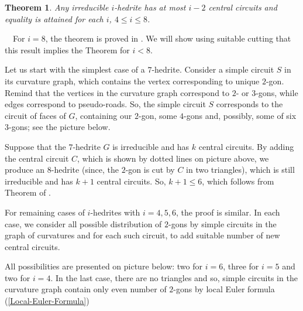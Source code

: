 \documentclass[12pt]{article}
\newtheorem{theor}{Theorem}
\newcommand{\proof}{\noindent{\bf Proof.}\ \ }
\begin{document}
\begin{theor}\label{irre}
Any irreducible $i$-hedrite has at most $i-2$ central circuits and equality is attained for each $i$, $4\leq i\leq 8$.
\end{theor}
\proof For $i=8$, the theorem is proved in \cite{DSt}. We will show using suitable cutting that this result implies the Theorem for $i<8$.

Let us start with the simplest case of a $7$-hedrite. Consider a simple circuit $S$ in its curvature graph, which contains the vertex corresponding to unique $2$-gon. Remind that the vertices in the curvature graph correspond to $2$- or $3$-gons, while edges correspond to pseudo-roads. So, the simple circuit $S$ corresponds to the circuit of faces of $G$, containing our $2$-gon, some $4$-gons and, possibly, some of six $3$-gons; see the picture below.


\begin{center}
\epsfxsize=60mm
\end{center}






Suppose that the $7$-hedrite $G$ is irreducible and has $k$ central circuits. By adding the central circuit $C$, which is shown by dotted lines on picture above, we produce an $8$-hedrite (since, the $2$-gon is cut by $C$ in two triangles), which is still irreducible and has $k+1$ central circuits. So, $k+1\leq 6$, which follows from Theorem of \cite{DSt}.


For remaining cases of $i$-hedrites with $i=4,5,6$, the proof is similar. In each case, we consider all possible distribution of $2$-gons by simple circuits in the graph of curvatures and for each such circuit, to add suitable number of new central circuits. 


All possibilities are presented on picture below: two for $i=6$, three for $i=5$ and two for $i=4$. In the last case, there are no triangles and so, simple circuits in the curvature graph contain only even number of $2$-gons by local Euler formula (\ref{Local-Euler-Formula})


\begin{center}
\epsfxsize=60mm
\end{center}
\end{document}
